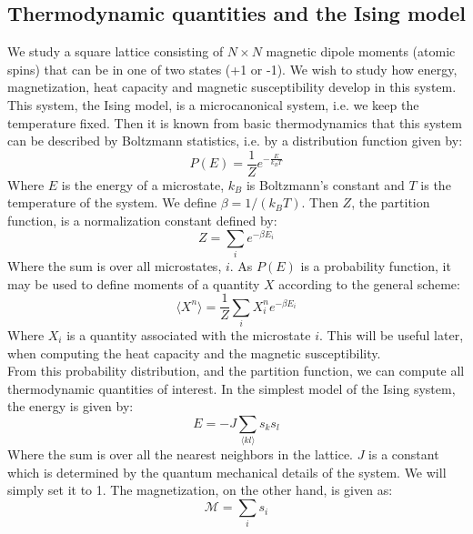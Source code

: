\documentclass[a4paper, 10pt]{article}
\begin{document}
\subsection{Thermodynamic quantities and the Ising model}
We study a square lattice consisting of $N\times N$ magnetic dipole moments (atomic spins) that can be in one of two states (+1 or -1). We wish to study how energy, magnetization, heat capacity and magnetic susceptibility develop in this system. This system, the Ising model, is a microcanonical system, i.e. we keep the temperature fixed. Then it is known from basic thermodynamics that this system can be described by Boltzmann statistics, i.e. by a distribution function given by:
\begin{equation}\label{eq:Boltzmann_probability}
P(E)=\frac{1}{Z}e^{-\frac{E}{k_BT}}
\end{equation}
Where $E$ is the energy of a microstate, $k_B$ is Boltzmann's constant and $T$ is the temperature of the system. We define $\beta = 1/(k_BT)$. Then $Z$, the partition function, is a normalization constant defined by:
\begin{equation}\label{eq:Parition_function}
Z=\sum_{i} e^{-\beta E_i}
\end{equation}
Where the sum is over all microstates, $i$. As $P(E)$ is a probability function, it may be used to define moments of a quantity $X$ according to the general scheme: 
\begin{equation}
\langle X^n \rangle = \frac{1}{Z}\sum_i X_i^n e^{-\beta E_i}
\end{equation}
Where $X_i$ is a quantity associated with the microstate $i$. This will be useful later, when computing the heat capacity and the magnetic susceptibility.\\
\linebreak
From this probability distribution, and the partition function, we can compute all thermodynamic quantities of interest.
\linebreak
In the simplest model of the Ising system, the energy is given by:
\begin{equation}\label{eq:ising_system_energy}
E=-J\sum_{\langle kl \rangle} s_ks_l
\end{equation}
Where the sum is over all the nearest neighbors in the lattice. $J$ is a constant which is determined by the quantum mechanical details of the system. We will simply set it to 1. The magnetization, on the other hand, is given as:
\begin{equation}
\mathcal{M}=\sum_i s_i
\end{equation}
\end{document}
